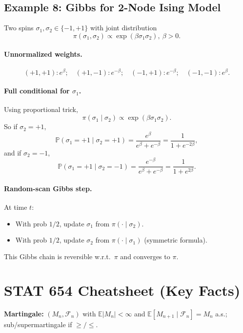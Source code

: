 \documentclass[answers,12pt,addpoints]{exam}
\begin{document}

\subsection*{Example 8: Gibbs for 2-Node Ising Model}

Two spins $\sigma_1,\sigma_2\in\{-1,+1\}$ with joint distribution
\[
\pi(\sigma_1,\sigma_2)\propto \exp(\beta \sigma_1\sigma_2),\ \beta>0.
\]

\paragraph{Unnormalized weights.}
\[
(+1,+1): e^\beta;\quad (+1,-1): e^{-\beta};\quad (-1,+1): e^{-\beta};\quad (-1,-1): e^\beta.
\]

\paragraph{Full conditional for $\sigma_1$.}
Using proportional trick,
\[
\pi(\sigma_1\mid\sigma_2)\propto \exp(\beta \sigma_1\sigma_2).
\]
So if $\sigma_2=+1$,
\[
\mathbb{P}(\sigma_1=+1\mid\sigma_2=+1)=\frac{e^\beta}{e^\beta+e^{-\beta}}=\frac{1}{1+e^{-2\beta}},
\]
and if $\sigma_2=-1$,
\[
\mathbb{P}(\sigma_1=+1\mid\sigma_2=-1)=\frac{e^{-\beta}}{e^\beta+e^{-\beta}}=\frac{1}{1+e^{2\beta}}.
\]

\paragraph{Random-scan Gibbs step.}
At time $t$:
\begin{itemize}
\item With prob $1/2$, update $\sigma_1$ from $\pi(\cdot\mid \sigma_2)$.
\item With prob $1/2$, update $\sigma_2$ from $\pi(\cdot\mid \sigma_1)$ (symmetric formula).
\end{itemize}
This Gibbs chain is reversible w.r.t.\ $\pi$ and converges to $\pi$.

\section*{STAT 654 Cheatsheet (Key Facts)}


\textbf{Martingale:}
$(M_n,\mathcal{F}_n)$ with $\mathbb{E}|M_n|<\infty$ and $\mathbb{E}[M_{n+1}\mid\mathcal{F}_n]=M_n$ a.s.; sub/supermartingale if $\ge / \le$.  
\end{document}
